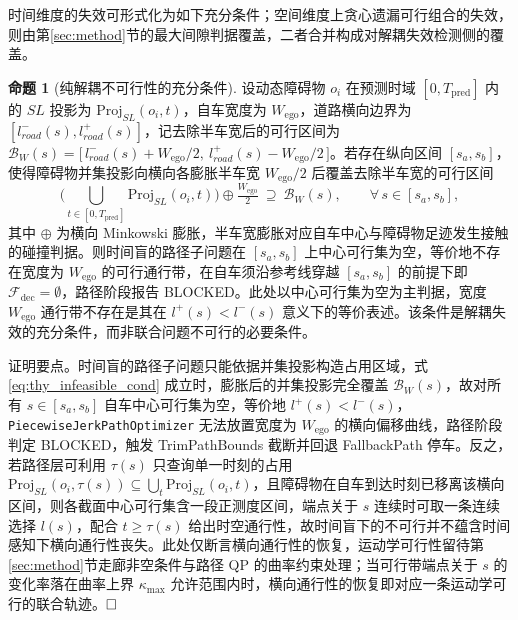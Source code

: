 \documentclass[a4paper,zihao=5]{ctexart}
\theoremstyle{definition}
\newtheorem{proposition}{命题}[section]
\begin{document}
时间维度的失效可形式化为如下充分条件；空间维度上贪心遗漏可行组合的失效，则由第\ref{sec:method}节的最大间隙判据覆盖，二者合并构成对解耦失效检测侧的覆盖。

\begin{proposition}[纯解耦不可行性的充分条件]
\label{prop:decoupled_infeasible}
设动态障碍物 $o_i$ 在预测时域 $[0, T_{\text{pred}}]$ 内的 $SL$ 投影为 $\mathrm{Proj}_{SL}(o_i, t)$，自车宽度为 $W_{\text{ego}}$，道路横向边界为 $[l_{road}^{-}(s), l_{road}^{+}(s)]$，记去除半车宽后的可行区间为 $\mathcal{B}_{W}(s) = \bigl[\, l_{road}^{-}(s) + W_{\text{ego}}/2,\ l_{road}^{+}(s) - W_{\text{ego}}/2 \,\bigr]$。若存在纵向区间 $[s_a, s_b]$，使得障碍物并集投影向横向各膨胀半车宽 $W_{\text{ego}}/2$ 后覆盖去除半车宽的可行区间
\begin{equation}
    \Big(\bigcup_{t \in [0, T_{\text{pred}}]} \mathrm{Proj}_{SL}(o_i, t)\Big) \oplus \tfrac{W_{\text{ego}}}{2}\ \supseteq\ \mathcal{B}_{W}(s), \qquad \forall\, s \in [s_a, s_b],
    \label{eq:thy_infeasible_cond}
\end{equation}
其中 $\oplus$ 为横向 Minkowski 膨胀，半车宽膨胀对应自车中心与障碍物足迹发生接触的碰撞判据。则时间盲的路径子问题在 $[s_a, s_b]$ 上中心可行集为空，等价地不存在宽度为 $W_{\text{ego}}$ 的可行通行带，在自车须沿参考线穿越 $[s_a, s_b]$ 的前提下即 $\mathcal{F}_{\text{dec}} = \emptyset$，路径阶段报告 BLOCKED。此处以中心可行集为空为主判据，宽度 $W_{\text{ego}}$ 通行带不存在是其在 $l^{+}(s) < l^{-}(s)$ 意义下的等价表述。该条件是解耦失效的充分条件，而非联合问题不可行的必要条件。
\end{proposition}

证明要点。时间盲的路径子问题只能依据并集投影构造占用区域，式 \eqref{eq:thy_infeasible_cond} 成立时，膨胀后的并集投影完全覆盖 $\mathcal{B}_{W}(s)$，故对所有 $s \in [s_a, s_b]$ 自车中心可行集为空，等价地 $l^{+}(s) < l^{-}(s)$，\texttt{PiecewiseJerkPathOptimizer} 无法放置宽度为 $W_{\text{ego}}$ 的横向偏移曲线，路径阶段判定 BLOCKED，触发 TrimPathBounds 截断并回退 FallbackPath 停车。反之，若路径层可利用 $\tau(s)$ 只查询单一时刻的占用 $\mathrm{Proj}_{SL}(o_i, \tau(s)) \subseteq \bigcup_t \mathrm{Proj}_{SL}(o_i, t)$，且障碍物在自车到达时刻已移离该横向区间，则各截面中心可行集含一段正测度区间，端点关于 $s$ 连续时可取一条连续选择 $l(s)$，配合 $t \geq \tau(s)$ 给出时空通行性，故时间盲下的不可行并不蕴含时间感知下横向通行性丧失。此处仅断言横向通行性的恢复，运动学可行性留待第\ref{sec:method}节走廊非空条件与路径 QP 的曲率约束处理；当可行带端点关于 $s$ 的变化率落在曲率上界 $\kappa_{\max}$ 允许范围内时，横向通行性的恢复即对应一条运动学可行的联合轨迹。$\hfill\Box$
\end{document}

